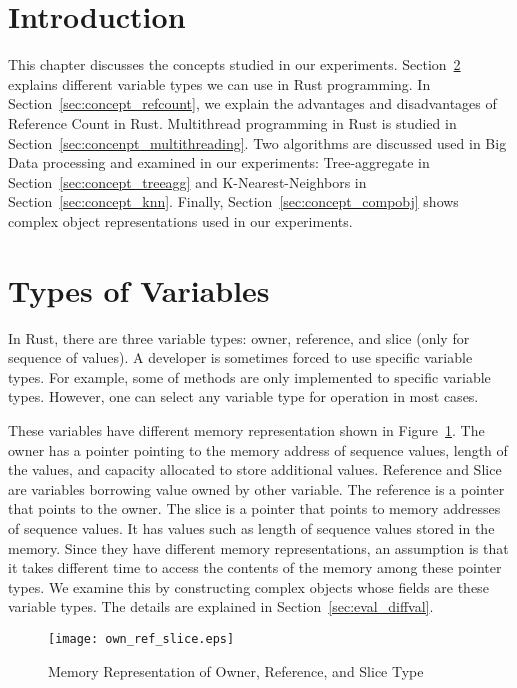 \section{Introduction}
\label{sec::concept_intro}
This chapter discusses the concepts studied in our experiments. 
Section~\ref{sec:concept_diffval} explains different variable types we can use in Rust programming.
In Section~\ref{sec:concept_refcount}, we explain the advantages and disadvantages of Reference Count in Rust. 
Multithread programming in Rust is studied in Section~\ref{sec:concenpt_multithreading}. 
Two algorithms are discussed used in Big Data processing and examined in our experiments: 
Tree-aggregate in Section~\ref{sec:concept_treeagg} and K-Nearest-Neighbors in Section~\ref{sec:concept_knn}.
Finally, Section~\ref{sec:concept_compobj} shows complex object representations used in our experiments. 

\section{Types of Variables}
\label{sec:concept_diffval}
In Rust, there are three variable types: owner, reference, and slice (only for sequence of values). 
A developer is sometimes forced to use specific variable types. For example, some of methods are only implemented to specific variable types.
However, one can select any variable type for operation in most cases.

These variables have different memory representation shown in Figure~\ref{fig:own_ref_slice}.
The owner has a pointer pointing to the memory address of sequence values, length of the values, and capacity allocated to store additional values. 
Reference and Slice are variables borrowing value owned by other variable. The reference is a pointer that points to the owner. 
The slice is a pointer that points to memory addresses of sequence values. It has values such as length of sequence values stored in the memory. 
Since they have different memory representations, an assumption is that it takes different time to access the contents of the memory among these pointer types.
We examine this by constructing complex objects whose fields are these variable types. The details are explained in Section~\ref{sec:eval_diffval}.

\begin{figure}[htb]
    \texttt{[image: own\_ref\_slice.eps]}
    \caption{Memory Representation of Owner, Reference, and Slice Type}
    \label{fig:own_ref_slice}
\end{figure}

